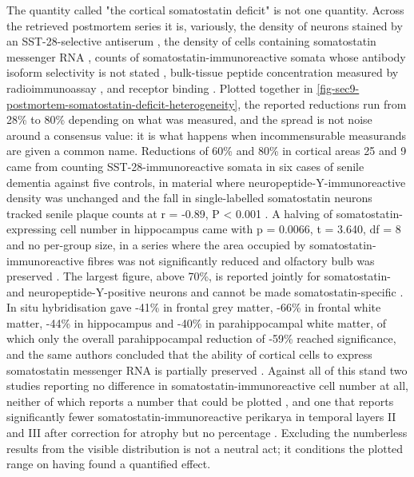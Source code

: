 \documentclass[11pt]{article}
\begin{document}
The quantity called "the cortical somatostatin deficit" is not one quantity. Across the retrieved postmortem series it is, variously, the density of neurons stained by an SST-28-selective antiserum \citep{Gaspar1989}, the density of cells containing somatostatin messenger RNA \citep{Dournaud1994}, counts of somatostatin-immunoreactive somata whose antibody isoform selectivity is not stated \citep{Kumar2005,GonzalezRodriguez2021}, bulk-tissue peptide concentration measured by radioimmunoassay \citep{Rossor1980,Reinikainen1987,Gabriel1993}, and receptor binding \citep{Beal1985b}. Plotted together in \ref{fig-sec9-postmortem-somatostatin-deficit-heterogeneity}, the reported reductions run from 28\% to 80\% depending on what was measured, and the spread is not noise around a consensus value: it is what happens when incommensurable measurands are given a common name. Reductions of 60\% and 80\% in cortical areas 25 and 9 came from counting SST-28-immunoreactive somata in six cases of senile dementia against five controls, in material where neuropeptide-Y-immunoreactive density was unchanged and the fall in single-labelled somatostatin neurons tracked senile plaque counts at r = -0.89, P < 0.001 \citep{Gaspar1989}. A halving of somatostatin-expressing cell number in hippocampus came with p = 0.0066, t = 3.640, df = 8 and no per-group size, in a series where the area occupied by somatostatin-immunoreactive fibres was not significantly reduced and olfactory bulb was preserved \citep{GonzalezRodriguez2021}. The largest figure, above 70\%, is reported jointly for somatostatin- and neuropeptide-Y-positive neurons and cannot be made somatostatin-specific \citep{Kumar2005}. In situ hybridisation gave -41\% in frontal grey matter, -66\% in frontal white matter, -44\% in hippocampus and -40\% in parahippocampal white matter, of which only the overall parahippocampal reduction of -59\% reached significance, and the same authors concluded that the ability of cortical cells to express somatostatin messenger RNA is partially preserved \citep{Dournaud1994}. Against all of this stand two studies reporting no difference in somatostatin-immunoreactive cell number at all, neither of which reports a number that could be plotted \citep{Nakamura1986,Li1996b}, and one that reports significantly fewer somatostatin-immunoreactive perikarya in temporal layers II and III after correction for atrophy but no percentage \citep{Davies1990}. Excluding the numberless results from the visible distribution is not a neutral act; it conditions the plotted range on having found a quantified effect.
\end{document}
